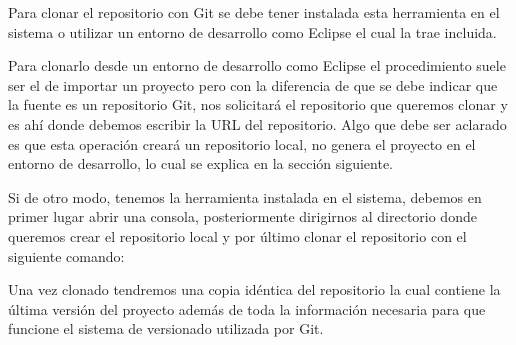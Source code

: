 Para clonar el repositorio con Git se debe tener instalada esta herramienta en el sistema \cite{instalacion_git} o utilizar un entorno de desarrollo como Eclipse el cual la trae incluida. 

Para clonarlo desde un entorno de desarrollo como Eclipse \cite{eclipse} el procedimiento suele ser el de importar un proyecto pero con la diferencia de que se debe indicar que la fuente es un repositorio Git, nos solicitar\'a el repositorio que queremos clonar y es ah\'i donde debemos escribir la URL del repositorio. Algo que debe ser aclarado es que esta operación crear\'a un repositorio local, no genera el proyecto en el entorno de desarrollo, lo cual se explica en la sección siguiente.

Si de otro modo, tenemos la herramienta instalada en el sistema, debemos en primer lugar abrir una consola, posteriormente dirigirnos al directorio donde queremos crear el repositorio local y por \'ultimo clonar el repositorio con el siguiente comando:


Una vez clonado tendremos una copia idéntica del repositorio la cual contiene la \'ultima versi\'on del proyecto adem\'as de toda la información necesaria para que funcione el sistema de versionado utilizada por Git. 





